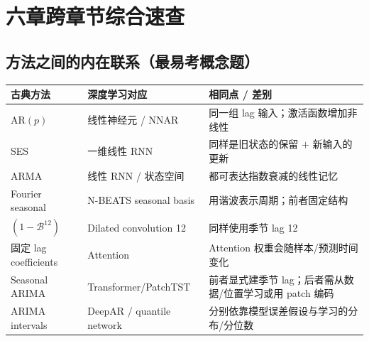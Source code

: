 \documentclass[UTF8,fontset=fandol,10.5pt,a4paper]{ctexart}
\newcommand{\thick}{\renewcommand{\arraystretch}{1.18}}
\begin{document}
\section{六章跨章节综合速查}
\subsection{方法之间的内在联系（最易考概念题）}
\begin{center}\small\thick\begin{tabularx}{0.99\linewidth}{lXX}
\toprule
古典方法 & 深度学习对应 & 相同点 / 差别 \\\midrule
AR$(p)$ & 线性神经元 / NNAR & 同一组 lag 输入；激活函数增加非线性 \\
SES & 一维线性 RNN & 同样是旧状态的保留 $+$ 新输入的更新 \\
ARMA & 线性 RNN / 状态空间 & 都可表达指数衰减的线性记忆 \\
Fourier seasonal & N-BEATS seasonal basis & 用谐波表示周期；前者固定结构 \\
$(1-\mathcal B^{12})$ & Dilated convolution 12 & 同样使用季节 lag 12 \\
固定 lag coefficients & Attention & Attention 权重会随样本/预测时间变化 \\
Seasonal ARIMA & Transformer/PatchTST & 前者显式建季节 lag；后者需从数据/位置学习或用 patch 编码 \\
ARIMA intervals & DeepAR / quantile network & 分别依靠模型误差假设与学习的分布/分位数 \\
\bottomrule\end{tabularx}\end{center}
\end{document}
